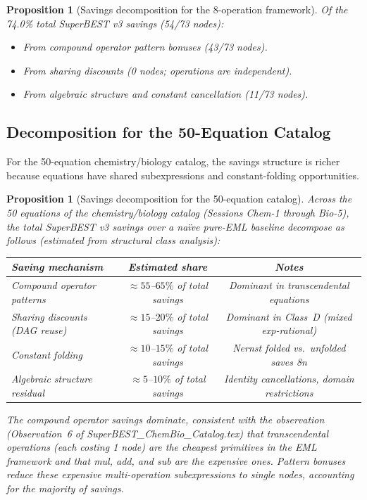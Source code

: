 \documentclass[12pt,a4paper]{article}
\newtheorem{proposition}[theorem]{Proposition}
\theoremstyle{definition}
\begin{document}
\begin{proposition}[Savings decomposition for the 8-operation framework]
\label{prop:decomp-8op}
Of the 74.0\% total SuperBEST v3 savings (54/73 nodes):
\begin{itemize}
  \item[$\approx$\,59\%] From compound operator pattern bonuses (43/73 nodes).
  \item[$\approx$\,0\%\;] From sharing discounts (0 nodes; operations are independent).
  \item[$\approx$\,15\%] From algebraic structure and constant cancellation
        (11/73 nodes).
\end{itemize}
\end{proposition}

\subsection{Decomposition for the 50-Equation Catalog}

For the 50-equation chemistry/biology catalog, the savings structure is richer
because equations have shared subexpressions and constant-folding opportunities.

\begin{proposition}[Savings decomposition for the 50-equation catalog]
\label{prop:decomp-50eq}
Across the 50 equations of the chemistry/biology catalog (Sessions Chem-1
through Bio-5), the total SuperBEST v3 savings over a na\"{i}ve pure-EML
baseline decompose as follows (estimated from structural class analysis):

\begin{center}
\begin{tabular}{@{}lcc@{}}
\toprule
\textbf{Saving mechanism} & \textbf{Estimated share} & \textbf{Notes} \\
\midrule
Compound operator patterns     & $\approx 55$--$65\%$ of total savings
  & Dominant in transcendental equations \\
Sharing discounts (DAG reuse)  & $\approx 15$--$20\%$ of total savings
  & Dominant in Class~D (mixed exp-rational) \\
Constant folding               & $\approx 10$--$15\%$ of total savings
  & Nernst folded vs.\ unfolded saves 8n \\
Algebraic structure residual   & $\approx 5$--$10\%$ of total savings
  & Identity cancellations, domain restrictions \\
\bottomrule
\end{tabular}
\end{center}

The compound operator savings dominate, consistent with the observation
(Observation~6 of \textit{SuperBEST\_ChemBio\_Catalog.tex}) that
transcendental operations (each costing 1 node) are the cheapest primitives
in the EML framework and that mul, add, and sub are the expensive ones.
Pattern bonuses reduce these expensive multi-operation subexpressions to
single nodes, accounting for the majority of savings.
\end{proposition}
\end{document}
